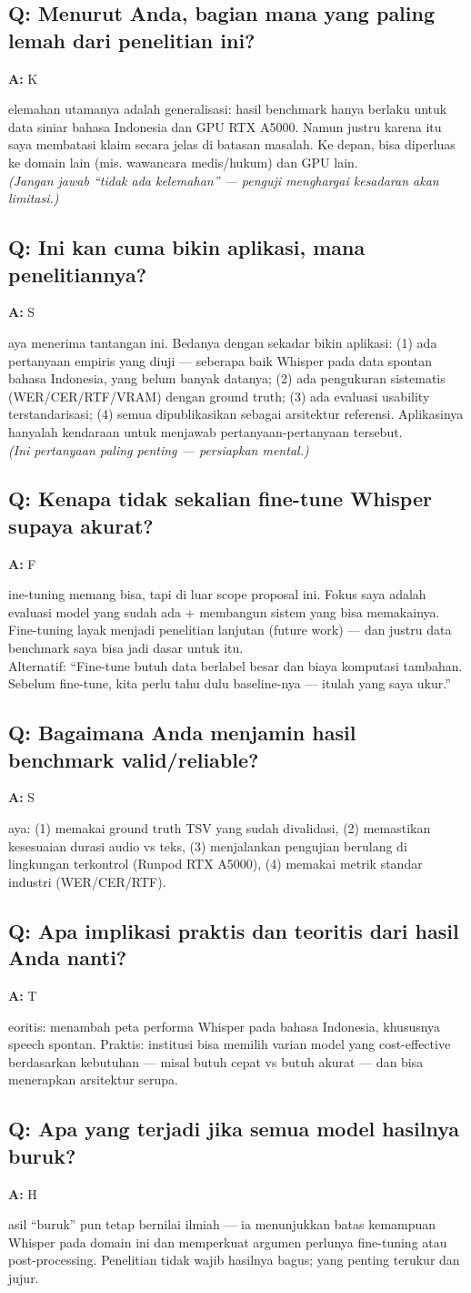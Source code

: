 \documentclass[11pt,a4paper]{article}
\newcommand{\qa}[2]{%
  \subsection*{\color{accent} Q: #1}%
  \textbf{A:} #2\par\vspace{0.6em}%
}
\begin{document}
\qa{Menurut Anda, bagian mana yang paling lemah dari penelitian ini?}
Kelemahan utamanya adalah generalisasi: hasil benchmark hanya berlaku untuk data siniar bahasa Indonesia dan GPU RTX A5000. Namun justru karena itu saya membatasi klaim secara jelas di batasan masalah. Ke depan, bisa diperluas ke domain lain (mis. wawancara medis/hukum) dan GPU lain.\\
\textit{(Jangan jawab ``tidak ada kelemahan'' --- penguji menghargai kesadaran akan limitasi.)}

\qa{Ini kan cuma bikin aplikasi, mana penelitiannya?}
Saya menerima tantangan ini. Bedanya dengan sekadar bikin aplikasi: (1) ada pertanyaan empiris yang diuji --- seberapa baik Whisper pada data spontan bahasa Indonesia, yang belum banyak datanya; (2) ada pengukuran sistematis (WER/CER/RTF/VRAM) dengan ground truth; (3) ada evaluasi usability terstandarisasi; (4) semua dipublikasikan sebagai arsitektur referensi. Aplikasinya hanyalah kendaraan untuk menjawab pertanyaan-pertanyaan tersebut.\\
\textit{(Ini pertanyaan paling penting --- persiapkan mental.)}

\qa{Kenapa tidak sekalian fine-tune Whisper supaya akurat?}
Fine-tuning memang bisa, tapi di luar scope proposal ini. Fokus saya adalah evaluasi model yang sudah ada + membangun sistem yang bisa memakainya. Fine-tuning layak menjadi penelitian lanjutan (future work) --- dan justru data benchmark saya bisa jadi dasar untuk itu.\\
Alternatif: ``Fine-tune butuh data berlabel besar dan biaya komputasi tambahan. Sebelum fine-tune, kita perlu tahu dulu baseline-nya --- itulah yang saya ukur.''

\qa{Bagaimana Anda menjamin hasil benchmark valid/reliable?}
Saya: (1) memakai ground truth TSV yang sudah divalidasi, (2) memastikan kesesuaian durasi audio vs teks, (3) menjalankan pengujian berulang di lingkungan terkontrol (Runpod RTX A5000), (4) memakai metrik standar industri (WER/CER/RTF).

\qa{Apa implikasi praktis dan teoritis dari hasil Anda nanti?}
Teoritis: menambah peta performa Whisper pada bahasa Indonesia, khususnya speech spontan. Praktis: institusi bisa memilih varian model yang cost-effective berdasarkan kebutuhan --- misal butuh cepat vs butuh akurat --- dan bisa menerapkan arsitektur serupa.

\qa{Apa yang terjadi jika semua model hasilnya buruk?}
Hasil ``buruk'' pun tetap bernilai ilmiah --- ia menunjukkan batas kemampuan Whisper pada domain ini dan memperkuat argumen perlunya fine-tuning atau post-processing. Penelitian tidak wajib hasilnya bagus; yang penting terukur dan jujur.
\end{document}
